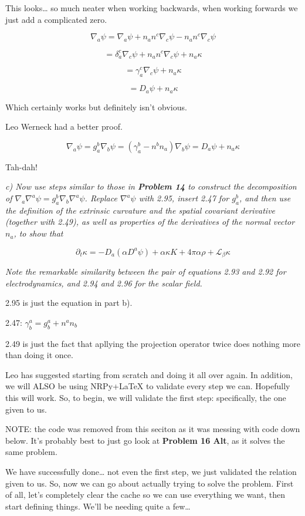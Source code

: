 \documentclass[landscape,letterpaper,10pt,english]{article}
\begin{document}
    This looks\ldots{} so much neater when working backwards, when working
forwards we just add a complicated zero.

\[\nabla_a \psi = \nabla_a \psi + n_a n^c \nabla_c \psi - n_a n^c \nabla_c \psi\]

\[ = \delta_a^c \nabla_c \psi + n_a n^c \nabla_c \psi + n_a \kappa \]

\[ = \gamma_a^c \nabla_c \psi + n_a \kappa \]

\[ = D_a \psi + n_a \kappa \]

Which certainly works but definitely isn't obvious.

    Leo Werneck had a better proof.

\[ \nabla_a \psi = g^b_a \nabla_b \psi = (\gamma^b_a - n^bn_a)\nabla_b \psi = D_a \psi + n_a \kappa \]

Tah-dah!

    \emph{c) Now use steps similar to those in \textbf{Problem 14} to
construct the decomposition of
\(\nabla_a\nabla^a \psi = g^b_a \nabla_b \nabla^a \psi\). Replace
\(\nabla^a \psi\) with 2.95, insert 2.47 for \(g^b_a\), and then use the
definition of the extrinsic curvature and the spatial covariant
derivative (together with 2.49), as well as properties of the
derivatives of the normal vector \(n_a\), to show that}

\[ \partial_t \kappa = -D_a(\alpha D^a \psi) + \alpha \kappa K + 4\pi \alpha\rho + \mathcal{L}_\beta \kappa \]

\emph{Note the remarkable similarity between the pair of equations 2.93
and 2.92 for electrodynamics, and 2.94 and 2.96 for the scalar field.}

    2.95 is just the equation in part b).

2.47: \(\gamma^a_b = g^a_b + n^an_b\)

2.49 is just the fact that apllying the projection operator twice does
nothing more than doing it once.

    Leo has suggested starting from scratch and doing it all over again. In
addition, we will ALSO be using NRPy+LaTeX to validate every step we
can. Hopefully this will work. So, to begin, we will validate the first
step: specifically, the one given to us.

NOTE: the code was removed from this seciton as it was messing with code
down below. It's probably best to just go look at \textbf{Problem 16
Alt}, as it solves the same problem.

    We have successfully done\ldots{} not even the first step, we just
validated the relation given to us. So, now we can go about actually
trying to solve the problem. First of all, let's completely clear the
cache so we can use everything we want, then start defining things.
We'll be needing quite a few\ldots{}
\end{document}
